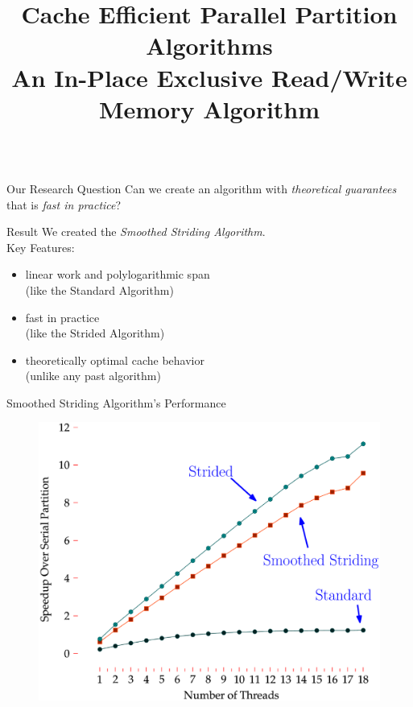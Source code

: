 \documentclass[table,serif,mathserif,final]{beamer}
\title{Cache Efficient Parallel Partition Algorithms \\An In-Place Exclusive Read/Write Memory Algorithm}
\theoremstyle{remark}
\begin{document}
\begin{frame}{}
\begin{columns}[t]
  \begin{column}{0.5\linewidth}
\begin{block}{\Huge Our Research Question}
  \justifying
  \Huge Can we create an algorithm with \emph{theoretical guarantees} that is \emph{fast in practice}?
\end{block}

\begin{block}{\Huge Result}
  \justifying
  \Huge We created the \emph{Smoothed Striding Algorithm}. \\
  Key Features:
	\begin{itemize}
		\item linear work and polylogarithmic span \\
			{\color{blue} (like the Standard Algorithm)\\}
		\vspace{0.15cm}
		\item fast in practice \\
			{\color{blue} (like the Strided Algorithm)\\}
	\vspace{0.15cm}
		\item theoretically optimal cache behavior \\
			{\color{blue} (unlike any past algorithm)}
	\end{itemize}
\end{block}

\begin{block}{\Huge Smoothed Striding Algorithm's Performance}
	\begin{figure}
		\begin{center}
			\includegraphics[width=0.9\linewidth]{imgs/compiledGraph.eps}
		\end{center}
	\end{figure}
\end{block}


\end{column}
\end{columns}
\end{frame}
\end{document}
